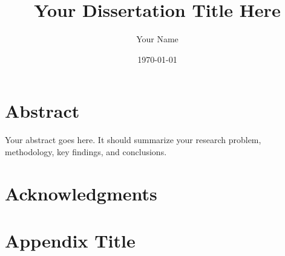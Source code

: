 \documentclass[12pt,a4paper]{report}
\title{Your Dissertation Title Here}
\author{Your Name}
\date{\today}
\begin{document}
\maketitle

\chapter*{Abstract}

Your abstract goes here. It should summarize your research problem, methodology, key findings, and conclusions.

\chapter*{Acknowledgments}


\tableofcontents
\listoffigures
\listoftables










\printbibliography

\appendix
\chapter{Appendix Title}
\end{document}
